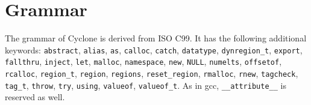 \section{Grammar}


\newcommand{\rulelabel}[1]{%
  \parbox[b]{\labelwidth}{\makebox[0pt][l]{\hypertarget{#1}{\textit{#1}}:}}}
\newcommand{\ruleoneoflabel}[1]{%
  \parbox[b]{\labelwidth}%
  {\makebox[0pt][l]{\hypertarget{#1}{\textit{#1}}: one of}}}
\newenvironment{rules}[1]{%
  \begin{list}{}{}%
    \renewcommand{\makelabel}{\rulelabel}%
  \item[#1]\mbox{}\\}{\end{list}}
\newenvironment{rulesoneof}[1]{%
  \begin{list}{}{}%
    \renewcommand{\makelabel}{\ruleoneoflabel}%
  \item[#1]\mbox{}\\}{\end{list}}

\newcommand{\nt}[1]{\hyperlink{#1}{\textit{#1}}} %
\newcommand{\tk}[1]{\texttt{#1}}                 %
\newcommand{\opt}{\ensuremath{_{\it\textcolor{bluegray}{opt}}}}

The grammar of Cyclone is derived from ISO C99.
It has the following additional keywords:
\texttt{abstract},
\texttt{alias},
\texttt{as},
\texttt{calloc},
\texttt{catch},
\texttt{datatype},
\texttt{dynregion_t},
\texttt{export},
\texttt{fallthru},
\texttt{inject},
\texttt{let},
\texttt{malloc},
\texttt{namespace},
\texttt{new},
\texttt{NULL},
\texttt{numelts},
\texttt{offsetof},
\texttt{rcalloc},
\texttt{region_t},
\texttt{region},
\texttt{regions},
\texttt{reset_region},
\texttt{rmalloc},
\texttt{rnew},
\texttt{tagcheck},
\texttt{tag_t},
\texttt{throw},
\texttt{try},
\texttt{using},
\texttt{valueof},
\texttt{valueof_t}.
As in gcc,
\texttt{__attribute__}
is reserved as well.

